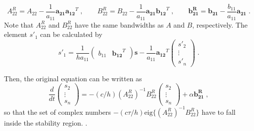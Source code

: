 {\begin{equation}
  A^R_{22}=A_{22}-\frac{1}{a_{11}}\mathbf{a_{21}}\mathbf{a_{12}}^T \;,\qquad
  B^R_{22}=B_{22}-\frac{1}{a_{11}}\mathbf{a_{21}}\mathbf{b_{12}}^T \;,\qquad
  \mathbf{b^R_{21}}=\mathbf{b_{21}}-\frac{b_{11}}{a_{11}}\mathbf{a_{21}} \;.
\end{equation}
Note that $A^R_{22}$ and $B^R_{22}$ have the same bandwidths as $A$ and $B$, respectively. The element $s'_1$ can be calculated by
\begin{equation}
  s'_1=\frac{1}{ha_{11}}
  \left(\begin{array}{cc}b_{11}\!&\!\mathbf{b_{12}}^T\end{array}\right)
  \mathbf{s} - \frac{1}{a_{11}}
  \mathbf{a_{12}}^T \left(\begin{array}{c}s'_2\\\vdots\\s'_n\end{array}\right)\;.
\end{equation}


Then, the original equation can be written as
\begin{equation}
  \frac{d}{dt}
  \left(\begin{array}{c}s_2\\\vdots\\s_n\end{array}\right) =
  -(c/h)(A^R_{22})^{-1}B^R_{22}\left(\begin{array}{c}s_2\\\vdots\\s_n\end{array}\right)+
  \alpha\mathbf{b^R_{21}} \;,
\end{equation}
so that the set of complex numbers $-(c\tau/h) \textrm{eig} \{(A^R_{22})^{-1}B^R_{22}\}$ have to fall inside the stability region. \citep{Carpenter:1993}.

}
